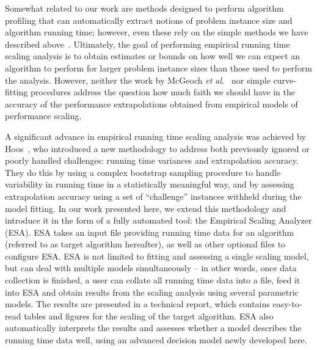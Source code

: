 \documentclass[aic]{iosart2x}
\newcommand{\etal}{\emph{et al.}}
\begin{document}
Somewhat related to our work are methods designed to perform algorithm profiling that can automatically extract notions of problem instance size and algorithm running time; however, even these rely on the simple methods we have described above~\cite{ZapHau12,CopEtAl12,CopEtAl14}. 
Ultimately, the goal of performing empirical running time scaling analysis is to obtain estimates or bounds on how well we can expect an algorithm to perform for larger problem instance sizes than those used to perform the analysis.
However, neither the work by McGeoch \etal~\cite{McgEtAl02} nor simple curve-fitting procedures address the  question how much faith we should have in the accuracy of the performance extrapolations obtained from empirical models of performance scaling.

A significant advance in empirical running time scaling analysis was achieved by Hoos~\cite{Hoo09}, who introduced a new methodology to address both previously ignored or poorly handled challenges: running time variances and extrapolation accuracy.
They do this by using a complex bootstrap sampling procedure to handle variability in running time in a statistically meaningful way, and by assessing extrapolation accuracy using a set of ``challenge'' instances withheld during the model fitting.  
In our work presented here, we extend this methodology and introduce it in the form of a fully automated tool: the Empirical Scaling Analyzer (ESA). 
ESA takes an input file providing running time data for an algorithm (referred to as target algorithm hereafter), as well as other optional files to configure ESA. 
ESA is not limited to fitting and assessing a single scaling model, but can deal with multiple models simultaneously -- in other words, once data collection is finished, a user can collate all running time data into a file, feed it into ESA and obtain results from the scaling analysis using several parametric models. 
The results are presented in a technical report, which contains easy-to-read tables and figures for the scaling of the target algorithm. 
ESA also automatically interprets the results and assesses whether a model describes the running time data well, using an advanced decision model newly developed here.
\end{document}
